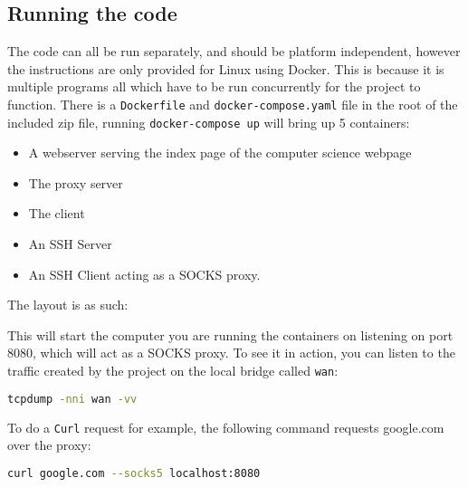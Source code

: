 \subsection{Running the code}
The code can all be run separately, and should be platform independent, however the instructions are only provided for Linux using Docker. This is because it is multiple programs all which have to be run concurrently for the project to function.
There is a \texttt{Dockerfile} and \texttt{docker-compose.yaml} file in the root of the included zip file, running \texttt{docker-compose up} will bring up 5 containers:
\begin{itemize}
    \item A webserver serving the index page of the computer science webpage
    \item The proxy server
    \item The client
    \item An SSH Server
    \item An SSH Client acting as a SOCKS proxy.
\end{itemize}
The layout is as such:
\begin{center}
\end{center}
This will start the computer you are running the containers on listening on port 8080, which will act as a SOCKS proxy.
To see it in action, you can listen to the traffic created by the project on the local bridge called \texttt{wan}:
\begin{lstlisting}[language=bash,numbers=none]
    tcpdump -nni wan -vv
\end{lstlisting}
To do a \texttt{Curl} request for example, the following command requests google.com over the proxy:
\begin{lstlisting}[language=bash,numbers=none]
    curl google.com --socks5 localhost:8080
\end{lstlisting}
